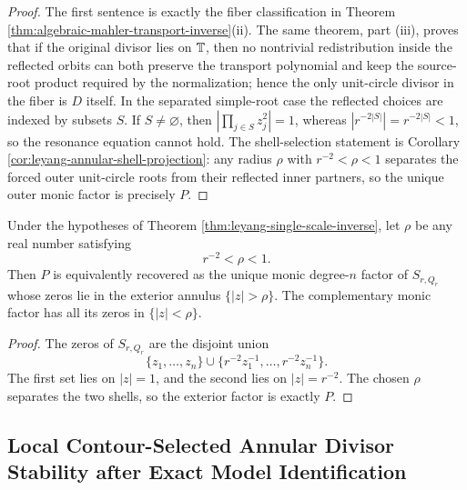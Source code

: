 \begin{proof}
The first sentence is exactly the fiber classification in Theorem \ref{thm:algebraic-mahler-transport-inverse}\textup{(ii)}.  The same theorem, part \textup{(iii)}, proves that if the original divisor lies on \(\mathbb{T}\), then no nontrivial redistribution inside the reflected orbits can both preserve the transport polynomial and keep the source-root product required by the normalization; hence the only unit-circle divisor in the fiber is \(D\) itself.  In the separated simple-root case the reflected choices are indexed by subsets \(S\).  If \(S\ne\varnothing\), then \(|\prod_{j\in S}z_j^2|=1\), whereas \(|r^{-2|S|}|=r^{-2|S|}<1\), so the resonance equation cannot hold.  The shell-selection statement is Corollary \ref{cor:leyang-annular-shell-projection}: any radius \(\rho\) with \(r^{-2}<\rho<1\) separates the forced outer unit-circle roots from their reflected inner partners, so the unique outer monic factor is precisely \(P\).
\end{proof}

\begin{corollary}\label{cor:leyang-annular-shell-projection}
Under the hypotheses of Theorem \ref{thm:leyang-single-scale-inverse}, let \(\rho\) be any real number satisfying
\[
r^{-2}<\rho<1.
\]
Then \(P\) is equivalently recovered as the unique monic degree-\(n\) factor of \(S_{r,Q_r}\) whose zeros lie in the exterior annulus \(\{|z|>\rho\}\).  The complementary monic factor has all its zeros in \(\{|z|<\rho\}\).
\end{corollary}

\begin{proof}
The zeros of \(S_{r,Q_r}\) are the disjoint union
\[
\{z_1,
\dots,z_n\}\cup\{r^{-2}z_1^{-1},
\dots,r^{-2}z_n^{-1}\}.
\]
The first set lies on \(|z|=1\), and the second lies on \(|z|=r^{-2}\).  The chosen \(\rho\) separates the two shells, so the exterior factor is exactly \(P\).
\end{proof}

\subsection{Local Contour-Selected Annular Divisor Stability after Exact Model Identification}\label{subsec:annular-rouche-stability}

